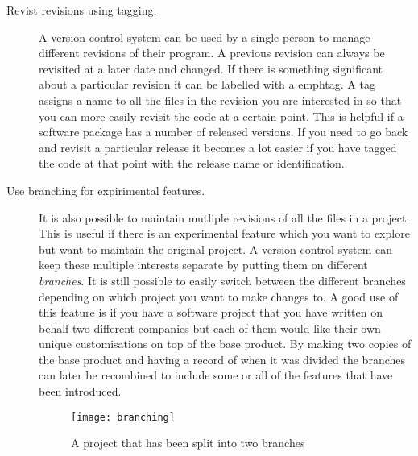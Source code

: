\begin{description}

  \item [Revist revisions using tagging.]   
    A version control system can be used by a single person to manage different revisions of their program. A previous revision can always be revisited at a later date and changed. If there is something significant about a particular revision it can be labelled with a emph{tag}. A tag assigns a name to all the files in the revision you are interested in so that you can more easily revisit the code at a certain point.  This is helpful if a software package has a number of released versions.  If you need to go back and revisit a particular release it becomes a lot easier if you have tagged the code at that point with the release name or identification.
   
   

  
  \item [Use branching for expirimental features.] 
  It is also possible to maintain mutliple revisions of all the files in a project. This is useful if there is an experimental feature which you want to explore but want to maintain the original project. A version control system can keep these multiple interests separate by putting them on different \emph{branches}.  It is still possible to easily switch between the different branches depending on which project you want to make changes to.  A good use of this feature is if you have a software project that you have written on behalf two different companies but each of them would like their own unique customisations on top of the base product.  By making two copies of the base product and having a record of when it was divided the branches can later be recombined to include some or all of the features that have been introduced.

  \begin{figure}[h]
  \begin{center}
  \texttt{[image: branching]}
  \end{center}
   \caption{A project that has been split into two branches}
  \end{figure}



\end{description}
